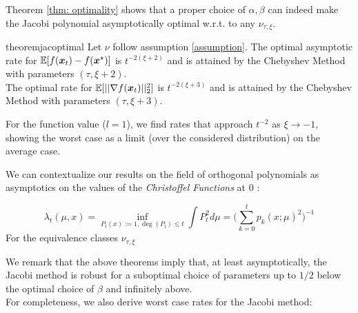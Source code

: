 \documentclass{article}
\begin{document}
Theorem \ref{thm: optimality} shows that a proper choice of $\alpha,\beta$ can indeed make the Jacobi polynomial asymptotically optimal w.r.t. to any $\nu_{\tau,\xi}$. 

\begin{restatable}{theorem}{jacoptimal}\label{thm: optimality}
Let $\nu$ follow assumption \ref{assumption}.
The optimal asymptotic rate for $\mathbb{E}[f({\boldsymbol x}_t)-f({\boldsymbol x}^\star)]$ is $t^{-2(\xi+2)}$ and is attained by the Chebyshev Method with parameters $(\tau,\xi+2)$. \\
The optimal rate for $\mathbb{E}[||\nabla f({\boldsymbol x}_t)||^2_2]$ is $t^{-2(\xi+3)}$ and is attained by the Chebyshev Method with parameters $(\tau,\xi+3)$.
\end{restatable}

For the function value ($l=1$), we find rates that approach $t^{-2}$ as $\xi\rightarrow -1$, showing the worst case as a limit (over the considered distribution) on the average case.
\begin{remark}
We can contextualize our results on the field of orthogonal polynomials as asymptotics on the values of the \textit{Christoffel Functions} at $0$ \cite{totik2005orthogonal}:

\begin{equation}
    \lambda_t(\mu,x)=\inf_{P_t(x):=1,\deg(P_t)\leq t}\int P_t^2 d\mu=\Big( \sum_{k=0}^tp_k(x;\mu)^2\Big)^{-1}
\end{equation}
 For the equivalence classes $\nu_{\tau,\xi}$
\end{remark}
We remark that the above theorems imply that, at least asymptotically, the Jacobi method is robust for a suboptimal choice of parameters up to $1/2$ below the optimal choice of $\beta$ and infinitely above. \\
For completeness, we also derive worst case rates for the Jacobi method:
\end{document}
